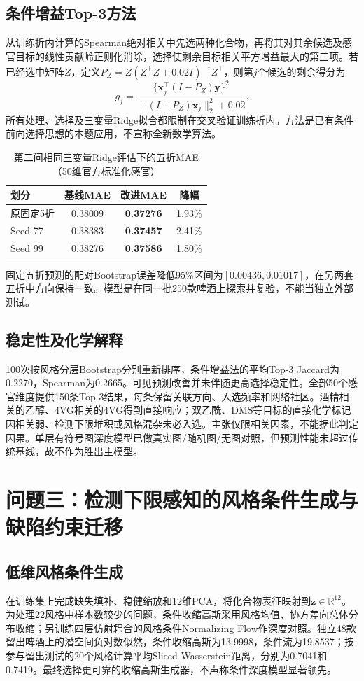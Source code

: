 \subsection{条件增益Top-3方法}
从训练折内计算的Spearman绝对相关中先选两种化合物，再将其对其余候选及感官目标的线性贡献岭正则化消除，选择使剩余目标相关平方增益最大的第三项。若已经选中矩阵$Z$，定义$P_Z=Z(Z^\top Z+0.02I)^{-1}Z^\top$，则第$j$个候选的剩余得分为
\begin{equation}
 g_j=\frac{\{\bm x_j^\top(I-P_Z)\bm y\}^2}{\|(I-P_Z)\bm x_j\|_2^2+0.02}.
\end{equation}
所有处理、选择及三变量Ridge拟合都限制在交叉验证训练折内。方法是已有条件前向选择思想的本题应用，不宣称全新数学算法。
\begin{table}[htbp]\centering\caption{第二问相同三变量Ridge评估下的五折MAE（50维官方标准化感官）}\label{tab:q2new}
\begin{tabular}{lccc}\toprule
划分 & 基线MAE & 改进MAE & 降幅\\\midrule
原固定5折 &0.38009 & \textbf{0.37276}&1.93\%\\
Seed 77 &0.38383 & \textbf{0.37457}&2.41\%\\
Seed 99 &0.38276 & \textbf{0.37586}&1.80\%\\
\bottomrule\end{tabular}\end{table}
固定五折预测的配对Bootstrap误差降低95\%区间为$[0.00436,0.01017]$，在另两套五折中方向保持一致。模型是在同一批250款啤酒上探索并复验，不能当独立外部测试。

\subsection{稳定性及化学解释}
100次按风格分层Bootstrap分别重新排序，条件增益法的平均Top-3 Jaccard为0.2270，Spearman为0.2665。可见预测改善并未伴随更高选择稳定性。全部50个感官维度提供150条Top-3结果，每条保留关联方向、入选频率和网络社区。酒精相关的乙醇、4VG相关的4VG得到直接响应；双乙酰、DMS等目标的直接化学标记因相关弱、检测下限堆积或风格混杂未必入选。主张仅限相关因素，不能据此判定因果。单层有符号图深度模型已做真实图/随机图/无图对照，但预测性能未超过传统基线，故不作为胜出主模型。

\section{问题三：检测下限感知的风格条件生成与缺陷约束迁移}
\subsection{低维风格条件生成}
在训练集上完成缺失填补、稳健缩放和12维PCA，将化合物表征映射到$\bm z\in\mathbb R^{12}$。为处理22风格中样本数较少的问题，条件收缩高斯采用风格均值、协方差向总体分布收缩；另训练四层仿射耦合的风格条件Normalizing Flow作深度对照。独立48款留出啤酒上的潜空间负对数似然，条件收缩高斯为13.9998，条件流为19.8537；按参与留出测试的20个风格计算平均Sliced Wasserstein距离，分别为0.7041和0.7419。最终选择更可靠的收缩高斯生成器，不声称条件深度模型显著领先。

